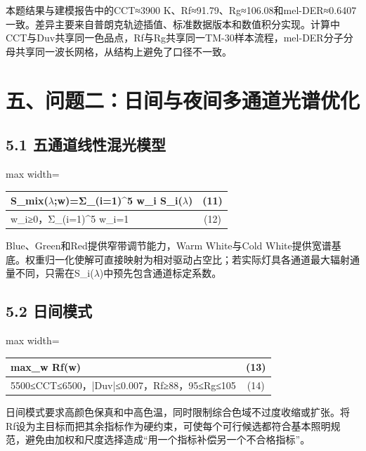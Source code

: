 \documentclass[UTF8,a4paper,12pt]{ctexart}
\begin{document}
本题结果与建模报告中的CCT≈3900 K、Rf≈91.79、Rg≈106.08和mel-DER≈0.6407一致。差异主要来自普朗克轨迹插值、标准数据版本和数值积分实现。计算中CCT与Duv共享同一色品点，Rf与Rg共享同一TM-30样本流程，mel-DER分子分母共享同一波长网格，从结构上避免了口径不一致。

\section{五、问题二：日间与夜间多通道光谱优化}

\subsection{5.1 五通道线性混光模型}

\begin{table}[H]
\centering
\small
\begin{adjustbox}{max width=\textwidth}
\begin{tabular}{lc}
\toprule
S\_mix($\lambda$;w)=Σ\_(i=1)\textasciicircum{}5 w\_i S\_i($\lambda$) & (11) \\
\midrule
w\_i≥0，Σ\_(i=1)\textasciicircum{}5 w\_i=1 & (12) \\
\bottomrule
\end{tabular}
\end{adjustbox}
\end{table}

Blue、Green和Red提供窄带调节能力，Warm White与Cold White提供宽谱基底。权重归一化使解可直接映射为相对驱动占空比；若实际灯具各通道最大辐射通量不同，只需在S\_i($\lambda$)中预先包含通道标定系数。

\subsection{5.2 日间模式}

\begin{table}[H]
\centering
\small
\begin{adjustbox}{max width=\textwidth}
\begin{tabular}{lc}
\toprule
max\_w Rf(w) & (13) \\
\midrule
5500≤CCT≤6500，|Duv|≤0.007，Rf≥88，95≤Rg≤105 & (14) \\
\bottomrule
\end{tabular}
\end{adjustbox}
\end{table}

日间模式要求高颜色保真和中高色温，同时限制综合色域不过度收缩或扩张。将Rf设为主目标而把其余指标作为硬约束，可使每个可行候选都符合基本照明规范，避免由加权和尺度选择造成“用一个指标补偿另一个不合格指标”。
\end{document}
